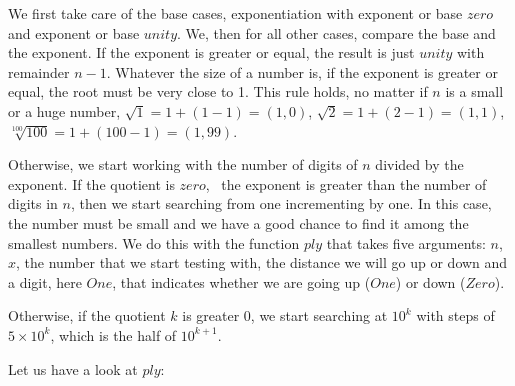 \documentclass{scrreprt}
\makeatletter
\newcommand{\Conid}[1]{\mathit{#1}}
\newcommand{\Varid}[1]{\mathit{#1}}
\newcommand{\anonymous}{\kern0.06em \vbox{\hrule\@width.5em}}
\def\resethooks{%
  \global\let\SaveRestoreHook\empty
  \global\let\ColumnHook\empty}
\newcommand{\hsindent}[1]{\quad}%
\makeatother
\begin{document}
{
\)\par\noindent\endgroup\resethooks

We first take care of the base cases,
exponentiation with exponent or base \ensuremath{\Varid{zero}}
and exponent or base \ensuremath{\Varid{unity}}.
We, then for all other cases,
compare the base and the exponent.
If the exponent is greater or equal,
the result is just \ensuremath{\Varid{unity}} with remainder $n - 1$.
Whatever the size of a number is,
if the exponent is greater or equal,
the root must be very close to 1.
This rule holds, no matter if \ensuremath{\Varid{n}} is a small
or a huge number, \eg\:
$\sqrt{1} = 1 + (1-1) = (1,0)$,
$\sqrt{2} = 1 + (2-1) = (1,1)$,
$\sqrt[100]{100} = 1 + (100-1) = (1,99)$.

Otherwise, we start working with the number of digits
of \ensuremath{\Varid{n}} divided by the exponent.
If the quotient is \ensuremath{\Varid{zero}}, \ie\ the exponent is greater
than the number of digits in \ensuremath{\Varid{n}},
then we start searching from one
incrementing by one.
In this case, the number must be small
and we have a good chance to find it 
among the smallest numbers.
We do this with the function \ensuremath{\Varid{ply}}
that takes five arguments:
$n$, $x$, 
the number that we start testing with,
the distance we will go up or down
and a digit, here \ensuremath{\Conid{One}}, that indicates
whether we are going up (\ensuremath{\Conid{One}}) or down (\ensuremath{\Conid{Zero}}).

Otherwise, if the quotient $k$ is greater 0, 
we start searching at $10^k$
with steps of $5  \times 10^k$,
which is the half of $10^{k+1}$.

Let us have a look at \ensuremath{\Varid{ply}}:

}
\end{document}

